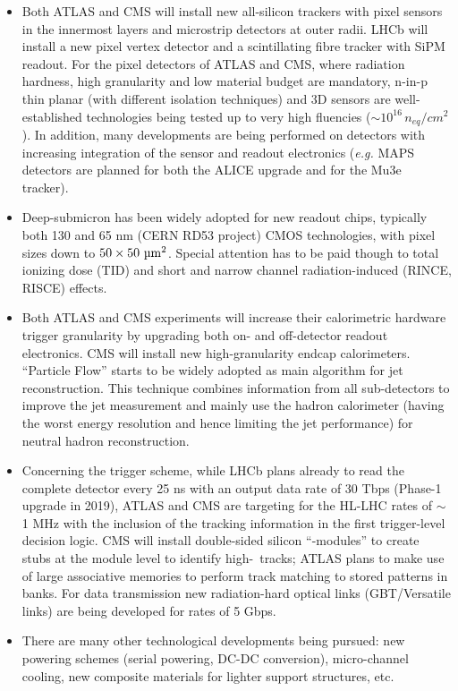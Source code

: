 \begin{itemize}

\item Both ATLAS and CMS will install new all-silicon trackers with pixel sensors in the innermost layers and microstrip detectors at outer radii. LHCb will install a new pixel vertex detector and a scintillating fibre tracker with SiPM readout. For the pixel detectors of ATLAS and CMS, where radiation hardness, high granularity and low material budget are mandatory, n-in-p thin planar (with different isolation techniques) and 3D sensors are well-established technologies being tested up to very high fluencies ($\sim 10^{16}\,\unit{n_{eq}/cm^2}$). In addition, many developments are being performed on detectors with increasing integration of the sensor and readout electronics ({\em e.g.} MAPS detectors are planned for both the ALICE upgrade and for the Mu3e tracker).

\item Deep-submicron has been widely adopted for new readout chips, typically both 130 and 65 nm (CERN RD53 project) CMOS technologies, with pixel sizes down to $50 \times 50~\si{\micro m\squared}$. Special attention has to be paid though to total ionizing dose (TID) and short and narrow channel radiation-induced (RINCE, RISCE) effects.

\item Both ATLAS and CMS experiments will increase their calorimetric hardware trigger granularity by upgrading both on- and off-detector readout electronics. CMS will install new high-granularity endcap calorimeters. ``Particle Flow'' starts to be widely adopted as main algorithm for jet reconstruction. This technique combines information from all sub-detectors to improve the jet measurement and mainly use the hadron calorimeter (having the worst energy resolution and hence limiting the jet performance) for neutral hadron reconstruction.

\item Concerning the trigger scheme, while LHCb plans already to read the complete detector every 25 ns with an output data rate of 30 Tbps (Phase-1 upgrade in 2019), ATLAS and CMS are targeting for the HL-LHC rates of $\sim$1 MHz with the inclusion of the tracking information in the first trigger-level decision logic. CMS will install double-sided silicon ``\pt-modules'' to create stubs at the module level to identify high-\pt\ tracks; ATLAS plans to make use of large associative memories to perform track matching to stored patterns in banks. For data transmission new radiation-hard optical links (GBT/Versatile links) are being developed for rates of 5 Gbps. 

\item There are many other technological developments being pursued: new powering schemes (serial powering, DC-DC conversion), micro-channel cooling, new composite materials for lighter support structures, etc.

\end{itemize}

